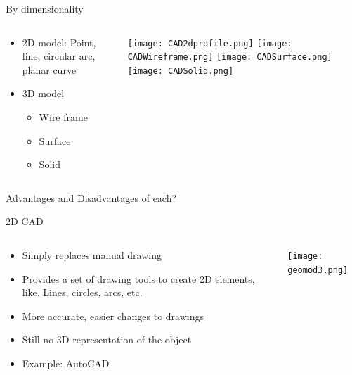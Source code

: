 \begin{frame}[fragile]{By dimensionality}
 \begin{columns}
  \begin{column}{0.55\linewidth}
\begin{itemize}
\item 2D model: Point, line, circular arc, planar curve
\item 3D model
	\begin{itemize}
	\item Wire frame

	\item Surface

	\item Solid

	\end{itemize}
\end{itemize}
  \end{column}%
  \begin{column}{0.45\linewidth}
			\begin{center}
\texttt{[image: CAD2dprofile.png]}
\texttt{[image: CADWireframe.png]}
\texttt{[image: CADSurface.png]}
	\texttt{[image: CADSolid.png]}

			\end{center}
  \end{column}
 \end{columns}
 
 Advantages and Disadvantages of each?

\end{frame}

\begin{frame}[fragile]{2D CAD}
 \begin{columns}
  \begin{column}{0.55\linewidth}
\begin{itemize}
\item Simply replaces manual drawing
\item Provides a set of drawing tools to create 2D elements, like, Lines, circles, arcs, etc.
\item More accurate, easier changes to drawings
\item Still no 3D representation of the object
\item Example: AutoCAD
\end{itemize}
  \end{column}%
  \begin{column}{0.45\linewidth}
			\begin{center}
	\texttt{[image: geomod3.png]}

			\end{center}
  \end{column}
 \end{columns}
 
\end{frame}

